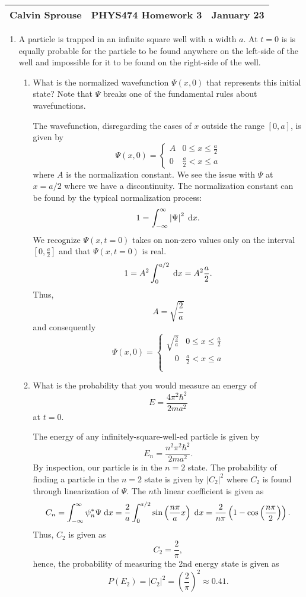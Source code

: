 \documentclass[a4paper, 12pt]{config/homework}
\begin{document}
\noindent
\begin{tabularx}{\textwidth}{>{\centering\arraybackslash}X>{\centering\arraybackslash}X>{\centering\arraybackslash}X}
Calvin Sprouse & PHYS474 Homework 3 & 2024 January 23\\
\midrule
\end{tabularx}

\begin{enumerate}
\item A particle is trapped in an infinite square well with a width \(a\). At \(t=0\) is is equally probable for the particle to be found anywhere on the left-side of the well and impossible for it to be found on the right-side of the well.
\begin{enumerate}[label=(\alph*)]
\item What is the normalized wavefunction \(\Psi(x,0)\) that represents this initial state? Note that \(\Psi\) breaks one of the fundamental rules about wavefunctions.

The wavefunction, disregarding the cases of \(x\) outside the range \([0,a]\), is given by
\[\Psi(x,0) = \begin{cases}
    A & 0 \le x \le \frac{a}{2} \\
    0 & \frac{a}{2} < x \le a
\end{cases}\]
where \(A\) is the normalization constant. We see the issue with \(\Psi\) at \(x=a/2\) where we have a discontinuity.
The normalization constant can be found by the typical normalization process:
\[1 = \bint{-\infty}{\infty}{\left|\Psi\right|^2}{x}.\]
We recognize \(\Psi(x,t=0)\) takes on non-zero values only on the interval \([0,\frac{a}{2}]\) and that \(\Psi(x,t=0)\) is real.
\[1 = A^2 \bint{0}{a/2}{}{x} = A^2 \frac{a}{2}.\]
Thus,
\[A = \sqrt{\frac{2}{a}}\]
and consequently
\[\Psi(x,0) = \begin{cases}
    \sqrt{\frac{2}{a}} & 0 \le x \le \frac{a}{2} \\
    \phantom{\sqrt{}}0 & \frac{a}{2} < x \le a
\end{cases}\]

\pagebreak
\item What is the probability that you would measure an energy of
\[E = \frac{4\pi^2\hbar^2}{2ma^2}\]
at \(t=0\).

The energy of any infinitely-square-well-ed particle is given by
\[E_n = \frac{n^2\pi^2\hbar^2}{2ma^2}.\]
By inspection, our particle is in the \(n=2\) state. The probability of finding a particle in the \(n=2\) state is given by \(\left| C_2 \right|^2\) where \(C_2\) is found through linearization of \(\Psi\). The \(n\)th linear coefficient is given as
\[C_n = \bint{-\infty}{\infty}{\psi_n^* \Psi}{x} = \frac{2}{a}\bint{0}{a/2}{\sin\left(\frac{n\pi}{a}x\right)}{x} = \frac{2}{n\pi}\left(1 - \cos\left(\frac{n\pi}{2}\right)\right).\]
Thus, \(C_2\) is given as
\[C_2 = \frac{2}{\pi},\]
hence, the probability of measuring the 2nd energy state is given as
\[P\left(E_2\right) = \left| C_2 \right|^2 = \left(\frac{2}{\pi}\right)^2 \approx 0.41 .\]


\end{enumerate}
\end{enumerate}
\end{document}
